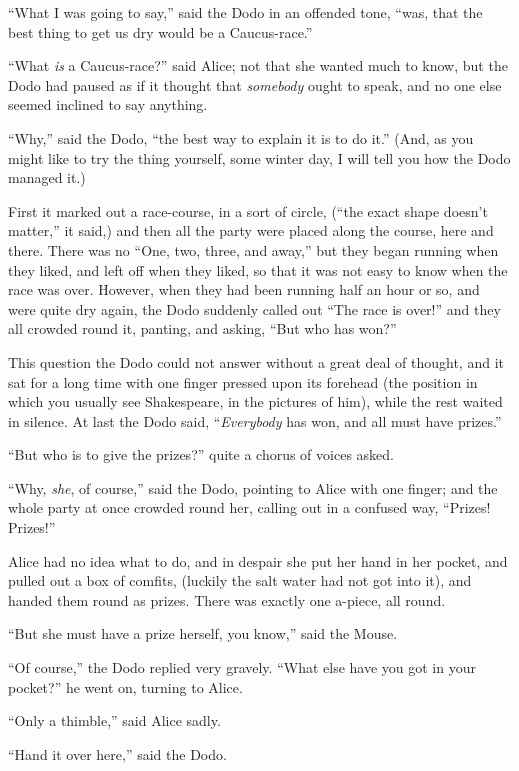 \documentclass[book, 20pt]{extbook}
\begin{document}
``What I was going to say,'' said the Dodo in an offended tone, ``was,
that the best thing to get us dry would be a Caucus-race.''

``What \emph{is} a Caucus-race?'' said Alice; not that she wanted much
to know, but the Dodo had paused as if it thought that \emph{somebody}
ought to speak, and no one else seemed inclined to say anything.

``Why,'' said the Dodo, ``the best way to explain it is to do it.''
(And, as you might like to try the thing yourself, some winter day, I
will tell you how the Dodo managed it.)

First it marked out a race-course, in a sort of circle, (``the exact
shape doesn't matter,'' it said,) and then all the party were placed
along the course, here and there. There was no ``One, two, three, and
away,'' but they began running when they liked, and left off when they
liked, so that it was not easy to know when the race was over. However,
when they had been running half an hour or so, and were quite dry again,
the Dodo suddenly called out ``The race is over!'' and they all crowded
round it, panting, and asking, ``But who has won?''

This question the Dodo could not answer without a great deal of thought,
and it sat for a long time with one finger pressed upon its forehead
(the position in which you usually see Shakespeare, in the pictures of
him), while the rest waited in silence. At last the Dodo said,
``\emph{Everybody} has won, and all must have prizes.''

``But who is to give the prizes?'' quite a chorus of voices asked.

``Why, \emph{she}, of course,'' said the Dodo, pointing to Alice with
one finger; and the whole party at once crowded round her, calling out
in a confused way, ``Prizes! Prizes!''

Alice had no idea what to do, and in despair she put her hand in her
pocket, and pulled out a box of comfits, (luckily the salt water had not
got into it), and handed them round as prizes. There was exactly one
a-piece, all round.

``But she must have a prize herself, you know,'' said the Mouse.

``Of course,'' the Dodo replied very gravely. ``What else have you got
in your pocket?'' he went on, turning to Alice.

``Only a thimble,'' said Alice sadly.

``Hand it over here,'' said the Dodo.
\end{document}
